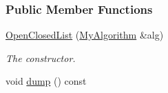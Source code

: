 \subsubsection*{Public Member Functions}
\begin{DoxyCompactItemize}
\item 
\hyperlink{structOpenClosedList_ae85243922d743121dbfb1066f5a3386e}{Open\+Closed\+List} (\hyperlink{structOpenClosedList_ad62a058ca7c52556d95529467a8eb9c9}{My\+Algorithm} \&alg)
\begin{DoxyCompactList}\small\item\em The constructor. \end{DoxyCompactList}\item 
void \hyperlink{structOpenClosedList_ab52d010c6c3b5155a35b8463de57771b}{dump} () const \hypertarget{structOpenClosedList_ab52d010c6c3b5155a35b8463de57771b}{}\label{structOpenClosedList_ab52d010c6c3b5155a35b8463de57771b}


\end{DoxyCompactItemize}
